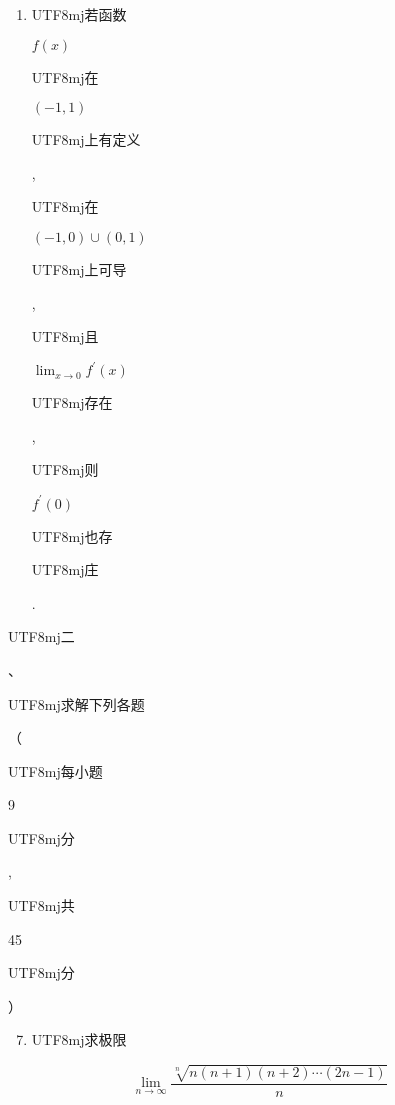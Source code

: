 \documentclass[10pt]{article}
\begin{document}
\begin{enumerate}
  \item \begin{CJK}{UTF8}{mj}若函数\end{CJK} $f(x)$ \begin{CJK}{UTF8}{mj}在\end{CJK} $(-1,1)$ \begin{CJK}{UTF8}{mj}上有定义\end{CJK}, \begin{CJK}{UTF8}{mj}在\end{CJK} $(-1,0) \cup(0,1)$ \begin{CJK}{UTF8}{mj}上可导\end{CJK}, \begin{CJK}{UTF8}{mj}且\end{CJK} $\lim _{x \rightarrow 0} f^{\prime}(x)$ \begin{CJK}{UTF8}{mj}存在\end{CJK}, \begin{CJK}{UTF8}{mj}则\end{CJK} $f^{\prime}(0)$ \begin{CJK}{UTF8}{mj}也存\end{CJK} \begin{CJK}{UTF8}{mj}庄\end{CJK}.

\end{enumerate}
\begin{CJK}{UTF8}{mj}二\end{CJK}、\begin{CJK}{UTF8}{mj}求解下列各题\end{CJK}（\begin{CJK}{UTF8}{mj}每小题\end{CJK} 9 \begin{CJK}{UTF8}{mj}分\end{CJK}, \begin{CJK}{UTF8}{mj}共\end{CJK} 45 \begin{CJK}{UTF8}{mj}分\end{CJK}）

\begin{enumerate}
  \setcounter{enumi}{6}
  \item \begin{CJK}{UTF8}{mj}求极限\end{CJK}
\end{enumerate}
$$
\lim _{n \rightarrow \infty} \frac{\sqrt[n]{n(n+1)(n+2) \cdots(2 n-1)}}{n}
$$
\end{document}
